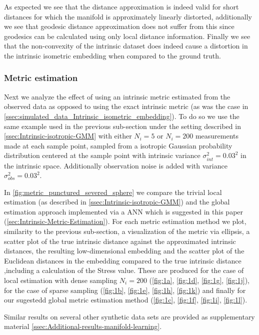 	As expected we see that the distance approximation is indeed valid for short distances for which the manifold is approximately linearly distorted, additionally we see that geodesic distance approximation does not suffer from this since geodesics can be calculated using only local distance information. Finally we see that the  non-convexity of the intrinsic dataset does indeed cause a distortion in the intrinsic isometric embedding when compared to the ground truth.

	\subsubsection{Metric estimation}
	
	Next we analyze the effect of using an intrinsic metric estimated from the observed data as opposed to using the exact intrinsic metric (as was the case in \cref{ssec:simulated_data_Intrinsic_isometric_embedding}). To do so we use the same example used in the previous sub-section under the setting described in \cref{ssec:Intrinsic-isotropic-GMM} with either $N_{i}=5$ or $N_{i}=200$ measurements made at each sample point, sampled from a isotropic Gaussian probability distribution centered at the sample point with intrinsic variance $\sigma_{int}^{2}=0.03^{2}$ in the intrinsic space. Additionally observation noise is added with variance $\sigma_{obs}^{2}=0.03^{2}$.
	
	In \cref{fig:metric_punctured_severed_sphere} we compare the trivial local estimation (as described in \cref{ssec:Intrinsic-isotropic-GMM}) and the global estimation approach implemented via a \ac{ANN} which is suggested in this paper (\cref{sec:Intrinsic-Metric-Estimation}). For each metric estimation method we plot, similarity to the previous sub-section, a visualization of the metric via ellipsis, a scatter plot of the true intrinsic distance against the approximated intrinsic distances, the resulting low-dimensional embedding and the scatter plot of the Euclidean distances in the embedding compared to the true intrinsic distance ,including a calculation of the Stress value. These are produced for the case of local estimation with dense sampling $N_{i}=200$ (\cref{fig:1a}, \cref{fig:1d}, \cref{fig:1g}, \cref{fig:1j}), for the case of sparse sampling (\cref{fig:1b}, \cref{fig:1e}, \cref{fig:1h}, \cref{fig:1k}) and finally for our sugestedd global metric estimation method (\cref{fig:1c}, \cref{fig:1f}, \cref{fig:1i}, \cref{fig:1l}).
	
	Similar results on several other synthetic data sets are provided as supplementary material \cref{ssec:Additional-results-manifold-learning}.
	
